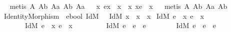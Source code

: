 \begin{isabellebody}
\ %
\endisadelimproof
%
\isatagproof
{}\isamarkupfalse%
\ {\isacharparenleft}metis\ A{}\ A{}b\ A{}a\ A{}b\ A{}a{\isacharparenright}%
\endisatagproof
{\isafoldproof}%
%
\isadelimproof
\ \isanewline
%
\endisadelimproof
{}\isamarkupfalse%
\ {\isachardoublequoteopen}{\isacharparenleft}\isactrlbold {\isasymforall}x{\isachardot}\ e{\isasymcdot}x\ {\isasymgreaterapprox}\ x{\isacharparenright}\ \isactrlbold {\isasymleftrightarrow}\ {\isacharparenleft}\isactrlbold {\isasymforall}x{\isachardot}\ x{\isasymcdot}e\ {\isasymgreaterapprox}\ x{\isacharparenright}{\isachardoublequoteclose}\isanewline
%
\isadelimproof
\ %
\endisadelimproof
%
\isatagproof
{}\isamarkupfalse%
\ {\isacharparenleft}metis\ A{}\ A{}b\ A{}a\ A{}b{\isacharparenright}%
\endisatagproof
{\isafoldproof}%
%
\isadelimproof
\isanewline
%
\endisadelimproof
\isanewline
\isanewline
{}\isamarkupfalse%
\ IdentityMorphism\ {\isacharcolon}{\isacharcolon}\ {\isachardoublequoteopen}e{\isasymRightarrow}bool{\isachardoublequoteclose}\ {\isacharparenleft}{\isachardoublequoteopen}IdM{\isacharunderscore}{\isachardoublequoteclose}\ {\isacharbrackleft}{}{\isacharbrackright}{}{}{\isacharparenright}\ \ {\isachardoublequoteopen}IdM\ x\ {\isasymequiv}\ x\ {\isasymapprox}\ {\isacharparenleft}{\isasymbox}x{\isacharparenright}{\isachardoublequoteclose}\isanewline
\isanewline
{}\isamarkupfalse%
\ {\isachardoublequoteopen}{\isacharparenleft}IdM\ e\ \isactrlbold {\isasymleftrightarrow}\ {\isacharparenleft}\isactrlbold {\isasymexists}x{\isachardot}\ e\ {\isasymapprox}\ {\isacharparenleft}{\isasymbox}x{\isacharparenright}{\isacharparenright}{\isacharparenright}\ \isactrlbold {\isasymand}\isanewline
\ \ \ \ \ \ \ {\isacharparenleft}IdM\ e\ \isactrlbold {\isasymleftrightarrow}\ {\isacharparenleft}\isactrlbold {\isasymexists}x{\isachardot}\ e\ {\isasymapprox}\ {\isacharparenleft}x{\isasymbox}{\isacharparenright}{\isacharparenright}{\isacharparenright}\ \isactrlbold {\isasymand}\ \isanewline
\ \ \ \ \ \ \ {\isacharparenleft}IdM\ e\ \isactrlbold {\isasymleftrightarrow}\ e\ {\isasymapprox}\ {\isacharparenleft}{\isasymbox}e{\isacharparenright}{\isacharparenright}\ \isactrlbold {\isasymand}\isanewline
\ \ \ \ \ \ \ {\isacharparenleft}IdM\ e\ \isactrlbold {\isasymleftrightarrow}\ e\ {\isasymapprox}\ {\isacharparenleft}e{\isasymbox}{\isacharparenright}{\isacharparenright}\ \isactrlbold {\isasymand}\isanewline

\end{isabellebody}

